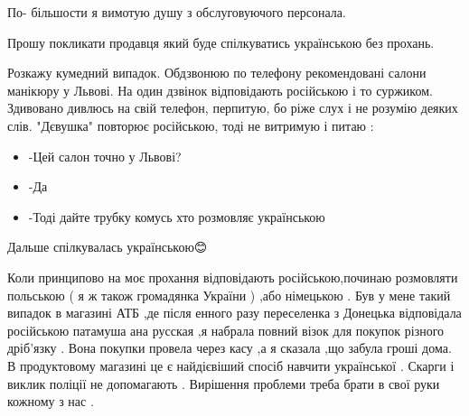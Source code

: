 \begin{itemize}
 
По- більшости я вимотую душу з обслуговуючого персонала.

 

Прошу покликати продавця який буде спілкуватись українською без прохань.

Розкажу кумедний випадок. Обдзвонюю по телефону рекомендовані салони манікюру у
Львові. На один дзвінок відповідають російською і то суржиком. Здивовано
дивлюсь на свій телефон, перпитую, бо ріже слух і не розумію деяких слів.
"Дєвушка" повторює російською, тоді не витримую і питаю :

\begin{itemize}
  \item -Цей салон точно у Львові?
  \item -Да
  \item -Тоді дайте трубку комусь хто розмовляє українською
\end{itemize}

Дальше спілкувалась українською😊

 

Коли принципово на моє прохання відповідають російською,починаю розмовляти
польською ( я ж також громадянка України ) ,або німецькою . Був у мене такий
випадок в магазині АТБ ,де після енного разу переселенка з Донецька відповідала
російською патамуша ана русская ,я набрала повний візок для покупок різного
дріб'язку . Вона покупки провела через касу ,а я сказала ,що забула гроші дома.
В продуктовому магазині це є найдієвіший спосіб навчити української . Скарги і
виклик поліції не допомагають . Вирішення проблеми треба брати в свої руки
кожному з нас .


 

\end{itemize}
